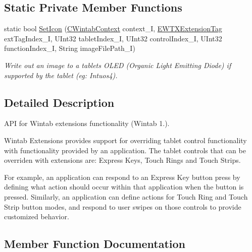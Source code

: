 \subsection*{Static Private Member Functions}
\begin{DoxyCompactItemize}
\item 
static bool \mbox{\hyperlink{class_wintab_d_n_1_1_c_wintab_extensions_a328174cc03d3baaed1772b68059a142b}{Set\+Icon}} (\mbox{\hyperlink{class_wintab_d_n_1_1_c_wintab_context}{C\+Wintab\+Context}} context\+\_\+I, \mbox{\hyperlink{namespace_wintab_d_n_a303ef868b8887dc43872ddac8a7d059b}{E\+W\+T\+X\+Extension\+Tag}} ext\+Tag\+Index\+\_\+I, U\+Int32 tablet\+Index\+\_\+I, U\+Int32 control\+Index\+\_\+I, U\+Int32 function\+Index\+\_\+I, String image\+File\+Path\+\_\+I)
\begin{DoxyCompactList}\small\item\em Write out an image to a tablet\textquotesingle{}s O\+L\+ED (Organic Light Emitting Diode) if supported by the tablet (eg\+: Intuos4). \end{DoxyCompactList}\end{DoxyCompactItemize}


\subsection{Detailed Description}
A\+PI for Wintab extensions functionality (Wintab 1.). 

Wintab Extensions provides support for overriding tablet control functionality with functionality provided by an application. The tablet controls that can be overriden with extensions are\+: Express Keys, Touch Rings and Touch Strips.

For example, an application can respond to an Express Key button press by defining what action should occur within that application when the button is pressed. Similarly, an application can define actions for Touch Ring and Touch Strip button modes, and respond to user swipes on those controls to provide customized behavior. 

\subsection{Member Function Documentation}
\mbox{\label{class_wintab_d_n_1_1_c_wintab_extensions_ac81f1953072b1c812e2602c835813cbe}} 
